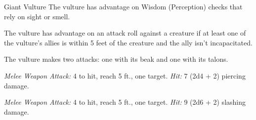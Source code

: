 \documentclass[10pt,a4paper,twoside,bg=print,twocolumn,openany,nodeprecatedcode]{dndbook}
\begin{document}
\begin{DndMonster}[float=t]{Giant Vulture}
\DndMonsterBasics[
armor-class = {10},
hit-points = {\DndDice{3d10 + 6}},
speed = {10 ft., fly 60 ft.}
]
\DndMonsterAbilityScores[
 str = 15,
 dex = 10,
 con = 15,
 int = 6,
 wis = 12,
 cha = 7
]
\DndMonsterDetails[
skills = {Perception +3},
languages = {understands Common but can't speak},
challenge = 1,
]
The vulture has advantage on Wisdom (Perception) checks that rely on sight or smell.

The vulture has advantage on an attack roll against a creature if at least one of the vulture's allies is within 5 feet of the creature and the ally isn't incapacitated.

The vulture makes two attacks: one with its beak and one with its talons.

\textsl{Melee Weapon Attack:} 4 to hit, reach 5 ft., one target. \textsl{Hit:} 7 (2d4 + 2) piercing damage.

\textsl{Melee Weapon Attack:} 4 to hit, reach 5 ft., one target. \textsl{Hit:} 9 (2d6 + 2) slashing damage.

\end{DndMonster}
\end{document}
